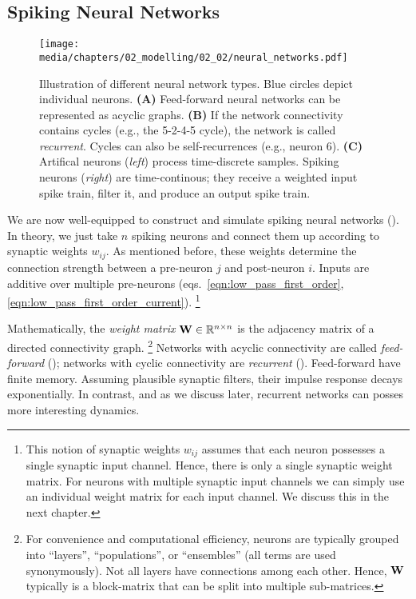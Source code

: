\pagebreak

\subsection{Spiking Neural Networks}
\label{sec:neural_networks}

\begin{figure}
	\centering
	\texttt{[image: media/chapters/02\_modelling/02\_02/neural\_networks.pdf]}%
	{\label{fig:neural_networks_a}}%
	{\label{fig:neural_networks_b}}%
	{\label{fig:neural_networks_c}}%
	\caption[Illustration of different neural network types]{Illustration of different neural network types. Blue circles depict individual neurons. \textbf{(A)} Feed-forward neural networks can be represented as acyclic graphs. \textbf{(B)} If the network connectivity contains cycles (e.g., the 5-2-4-5 cycle), the network is called \emph{recurrent}. Cycles can also be self-recurrences (e.g., neuron 6). \textbf{(C)} Artifical neurons (\emph{left}) process time-discrete samples. Spiking neurons (\emph{right}) are time-continous; they receive a weighted input spike train, filter it, and produce an output spike train.}
\end{figure}

We are now well-equipped to construct and simulate spiking neural networks (\SNNpl).
In theory, we just take $n$ spiking neurons and connect them up according to synaptic weights $w_{ij}$. As mentioned before, these weights determine the connection strength between a pre-neuron $j$ and post-neuron $i$. Inputs are additive over multiple pre-neurons (eqs.~\ref{eqn:low_pass_first_order}, \ref{eqn:low_pass_first_order_current}).%
\footnote{This notion of synaptic weights $w_{ij}$ assumes that each neuron possesses a single synaptic input channel.
Hence, there is only a single synaptic weight matrix.
For neurons with multiple synaptic input channels we can simply use an individual weight matrix for each input channel. We discuss this in the next chapter.}

Mathematically, the \emph{weight matrix} $\mathbf{W} \in \mathbb{R}^{n \times n}$ is the adjacency matrix of a directed connectivity graph.%
\footnote{For convenience and computational efficiency, neurons are typically grouped into \enquote{layers}, \enquote{populations}, or \enquote{ensembles} (all terms are used synonymously).
Not all layers have connections among each other. Hence, $\mathbf{W}$ typically is a block-matrix that can be split into multiple sub-matrices.}
Networks with acyclic connectivity are called \emph{feed-forward} (); networks with cyclic connectivity are \emph{recurrent} ().
Feed-forward \SNNpl have finite memory.
Assuming plausible synaptic filters, their impulse response decays exponentially.
In contrast, and as we discuss later, recurrent networks can posses more interesting dynamics.

